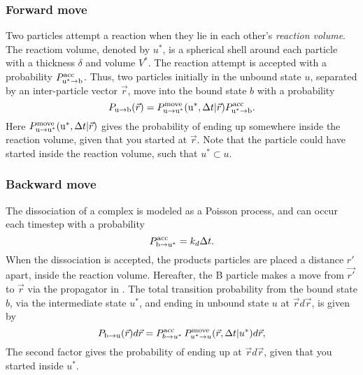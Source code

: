 \subsubsection{Forward move}
Two particles attempt a reaction when they lie in each other's {\it reaction volume}. The reactiom volume, denoted by $u^*$, is a spherical shell around each particle with a thickness $\delta$ and volume $V^*$. The reaction attempt is accepted with a probability $P^{\rm acc}_{{\rm u}^* \to {\rm b}}$. Thus, two particles initially in the unbound state $u$, separated by an inter-particle vector $\vec{r}$, move into the bound state $b$ with a probability
\begin{equation}
 \elabel{BD_Fwdmove}
P_{ \rm{u} \to \rm{b} }(\vec{r}) = P^{\rm move}_{{\rm u} \to {\rm u}^*}({\rm u}^*,\Delta t|\vec{r}) P^{\rm acc}_{{\rm u}^* \to {\rm b}}.
\end{equation}
Here $P^{\rm move}_{{\rm u} \to {\rm u}^*}({\rm u}^*,\Delta t|\vec{r})$ gives the probability of ending up somewhere inside the reaction volume, given that you started at $\vec{r}$. Note that the particle could have started inside the reaction volume, such that $u^* \subset u$.

\subsubsection{Backward move}
The dissociation of a complex is modeled as a Poisson process, and can occur each timestep with a probability
\begin{equation}
 P^{\rm acc}_{\rm b \to u^*} = k_d \Delta t.
\end{equation}
When the dissociation is accepted, the products particles are placed a distance $r'$ apart, inside the reaction volume. Hereafter, the B particle makes a move from $\vec{r'}$ to $\vec{r}$ via the propagator in . The total transition probability from the bound state $b$, via the intermediate state $u^*$, and ending in unbound state $u$ at $\vec{r}d\vec{r}$, is given by
\begin{equation}
 \elabel{BD_Bwdmove}
P_{ \rm{b} \to \rm{u}}(\vec{r})d\vec{r} =  P^{\rm acc}_{b \to u^*}\,P^{\rm move}_{u^* \to u}(\vec{r},\Delta t|u^*)d\vec{r},
\end{equation}
The second factor gives the probability of ending up at $\vec{r}d\vec{r}$, given that you started inside $u^*$.

